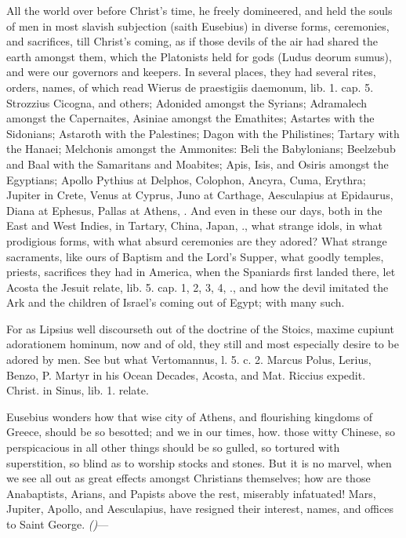 {All the world over before Christ's time, he freely domineered, and held
the souls of men in most slavish subjection (saith Eusebius) in
diverse forms, ceremonies, and sacrifices, till Christ's coming, as if
those devils of the air had shared the earth amongst them, which the
Platonists held for gods (Ludus deorum sumus), and were our
governors and keepers. In several places, they had several rites,
orders, names, of which read Wierus de praestigiis daemonum, lib. 1.
cap. 5. Strozzius Cicogna, and others; Adonided amongst the
Syrians; Adramalech amongst the Capernaites, Asiniae amongst the
Emathites; Astartes with the Sidonians; Astaroth with the Palestines;
Dagon with the Philistines; Tartary with the Hanaei; Melchonis amongst
the Ammonites: Beli the Babylonians; Beelzebub and Baal with the
Samaritans and Moabites; Apis, Isis, and Osiris amongst the Egyptians;
Apollo Pythius at Delphos, Colophon, Ancyra, Cuma, Erythra; Jupiter in
Crete, Venus at Cyprus, Juno at Carthage, Aesculapius at Epidaurus,
Diana at Ephesus, Pallas at Athens, \etc{}. And even in these our days,
both in the East and West Indies, in Tartary, China, Japan, \etc{}., what
strange idols, in what prodigious forms, with what absurd ceremonies
are they adored? What strange sacraments, like ours of Baptism and the
Lord's Supper, what goodly temples, priests, sacrifices they had in
America, when the Spaniards first landed there, let Acosta the Jesuit
relate, lib. 5. cap. 1, 2, 3, 4, \etc{}., and how the devil imitated the
Ark and the children of Israel's coming out of Egypt; with many such.

For as Lipsius well discourseth out of the doctrine of the Stoics,
maxime cupiunt adorationem hominum, now and of old, they still and most
especially desire to be adored by men. See but what Vertomannus, l. 5.
c. 2. Marcus Polus, Lerius, Benzo, P. Martyr in his Ocean Decades,
Acosta, and Mat. Riccius expedit. Christ. in Sinus, lib. 1. relate.

Eusebius wonders how that wise city of Athens, and flourishing
kingdoms of Greece, should be so besotted; and we in our times, how.
those witty Chinese, so perspicacious in all other things should be so
gulled, so tortured with superstition, so blind as to worship stocks
and stones. But it is no marvel, when we see all out as great effects
amongst Christians themselves; how are those Anabaptists, Arians, and
Papists above the rest, miserably infatuated! Mars, Jupiter, Apollo,
and Aesculapius, have resigned their interest, names, and offices to
Saint George.
\emph{(}\emph{)}---

}
